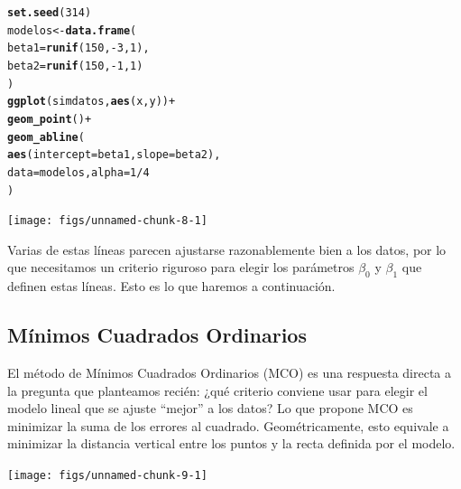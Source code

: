 \documentclass{article}\usepackage[]{graphicx}\usepackage[]{color}
\makeatletter
\newcommand{\hlnum}[1]{\textcolor[rgb]{0.686,0.059,0.569}{#1}}%
\newcommand{\hlopt}[1]{\textcolor[rgb]{0,0,0}{#1}}%
\newcommand{\hlstd}[1]{\textcolor[rgb]{0.345,0.345,0.345}{#1}}%
\newcommand{\hlkwb}[1]{\textcolor[rgb]{0.69,0.353,0.396}{#1}}%
\newcommand{\hlkwc}[1]{\textcolor[rgb]{0.333,0.667,0.333}{#1}}%
\newcommand{\hlkwd}[1]{\textcolor[rgb]{0.737,0.353,0.396}{\textbf{#1}}}%
\newenvironment{kframe}{%
 \def\at@end@of@kframe{}%
 \ifinner\ifhmode%
  \def\at@end@of@kframe{\end{minipage}}%
  \begin{minipage}{\columnwidth}%
 \fi\fi%
 \def\FrameCommand##1{\hskip\@totalleftmargin \hskip-\fboxsep
 \colorbox{shadecolor}{##1}\hskip-\fboxsep
     \hskip-\linewidth \hskip-\@totalleftmargin \hskip\columnwidth}%
 \MakeFramed {\advance\hsize-\width
   \@totalleftmargin\z@ \linewidth\hsize
   \@setminipage}}%
 {\par\unskip\endMakeFramed%
 \at@end@of@kframe}
\newenvironment{knitrout}{}{} %
\makeatother
\begin{document}
\begin{knitrout}
\color{fgcolor}\begin{kframe}
\begin{alltt}
\hlkwd{set.seed}\hlstd{(}\hlnum{314}\hlstd{)}
\hlstd{modelos} \hlkwb{<-} \hlkwd{data.frame}\hlstd{(}
  \hlkwc{beta1} \hlstd{=} \hlkwd{runif}\hlstd{(}\hlnum{150}\hlstd{,} \hlopt{-}\hlnum{3}\hlstd{,} \hlnum{1}\hlstd{),}
  \hlkwc{beta2} \hlstd{=} \hlkwd{runif}\hlstd{(}\hlnum{150}\hlstd{,} \hlopt{-}\hlnum{1}\hlstd{,} \hlnum{1}\hlstd{)}
\hlstd{)}
\hlkwd{ggplot}\hlstd{(simdatos,} \hlkwd{aes}\hlstd{(x, y))} \hlopt{+}
  \hlkwd{geom_point}\hlstd{()} \hlopt{+}
  \hlkwd{geom_abline}\hlstd{(}
    \hlkwd{aes}\hlstd{(}\hlkwc{intercept} \hlstd{= beta1,} \hlkwc{slope} \hlstd{= beta2),}
    \hlkwc{data} \hlstd{= modelos,} \hlkwc{alpha} \hlstd{=} \hlnum{1}\hlopt{/}\hlnum{4}
  \hlstd{)}
\end{alltt}
\end{kframe}

{\centering \texttt{[image: figs/unnamed-chunk-8-1]} 

}



\end{knitrout}

Varias de estas líneas parecen ajustarse razonablemente bien a los datos, por lo que necesitamos un criterio riguroso para elegir los parámetros $\beta_0$ y $\beta_1$ que definen estas líneas. Esto es lo que haremos a continuación.


\subsection{Mínimos Cuadrados Ordinarios}
\label{sec:MCO}

El método de Mínimos Cuadrados Ordinarios (MCO) es una respuesta directa a la pregunta que planteamos recién: ¿qué criterio conviene usar para elegir el modelo lineal que se ajuste ``mejor'' a los datos?
Lo que propone MCO es minimizar la suma de los errores al cuadrado.
Geométricamente, esto equivale a minimizar la distancia vertical entre los puntos y la recta definida por el modelo.

\begin{knitrout}
\color{fgcolor}

{\centering \texttt{[image: figs/unnamed-chunk-9-1]} 

}



\end{knitrout}
\end{document}

